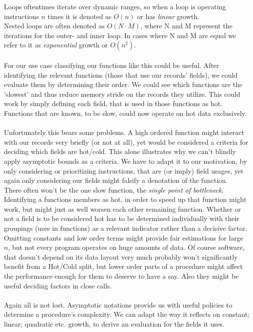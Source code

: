 Loops oftentimes iterate over dynamic ranges, so when a loop is operating instructions $n$ times it is denoted as $O(n)$ or has \textit{linear} growth.\\
Nested loops are often denoted as $O(N\cdot M)$, where N and M represent the iterations for the outer- and inner loop. In cases where N and M are equal we refer to it as \textit{exponential} growth or $O(n^2)$.\\\\
For our use case classifying our functions like this could be useful. After identifying the relevant functions (those that use our records' fields), we could evaluate them by determining their order. We could see which functions are the 'slowest' and thus reduce memory stride on the records they utilize. This could work by simply defining each field, that is used in those functions as hot. Functions that are known, to be slow, could now operate on hot data exclusively.\\\\
Unfortunately this bears some problems. A high ordered function might interact with our records very briefly (or not at all), yet would be considered a criteria for deciding which fields are hot/cold. This alone illustrates why we can't blindly apply asymptotic bounds as a criteria. We have to adapt it to our motivation, by only considering or prioritizing instructions, that are (or imply) field usages, yet again only considering our fields might falsify a denotation of the function.\\
There often won't be the one slow function, the \textit{single point of bottleneck}. Identifying a functions members as hot, in order to speed up that function might work, but might just as well worsen each other remaining function. Whether or not a field is to be considered hot has to be determined individually with their groupings (uses in functions) as a relevant indicator rather than a decisive factor.\\
Omitting constants and low order terms might provide fair estimations for large $n$, but not every program operates on huge amounts of data. Of course software, that doesn't depend on its data layout very much probably won't significantly benefit from a Hot/Cold split, but lower order parts of a procedure might affect the performance enough for them to deserve to have a say. Also they might be useful deciding factors in close calls.\\\\
Again all is not lost. Asymptotic notations provide us with useful policies to determine a procedure's complexity. We can adapt the way it reflects on constant; linear; quadratic etc. growth, to derive an evaluation for the fields it uses. 
\newline
